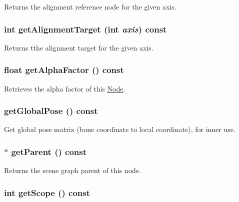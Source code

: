 Returns the alignment reference node for the given axis. \hypertarget{classm3g_1_1Node_e5bbf42b3d88193fda0b476e1b1da009}{
\subsubsection[{getAlignmentTarget}]{\setlength{\rightskip}{0pt plus 5cm}int getAlignmentTarget (int {\em axis}) const}}
\label{classm3g_1_1Node_e5bbf42b3d88193fda0b476e1b1da009}


Returns tthe alignment target for the given axis. \hypertarget{classm3g_1_1Node_bf7e8f9d9f530274aaf27e69910f8689}{
\subsubsection[{getAlphaFactor}]{\setlength{\rightskip}{0pt plus 5cm}float getAlphaFactor () const}}
\label{classm3g_1_1Node_bf7e8f9d9f530274aaf27e69910f8689}


Retrieves the alpha factor of this \hyperlink{classm3g_1_1Node}{Node}. \hypertarget{classm3g_1_1Node_b50dd3f0331a71cf820bbd1edc894ef0}{
\subsubsection[{getGlobalPose}]{ getGlobalPose () const}}
\label{classm3g_1_1Node_b50dd3f0331a71cf820bbd1edc894ef0}


Get global pose matrix (bone coordinate to local coordinate), for inner use. \hypertarget{classm3g_1_1Node_ce26c2757f265bc6038e6818d2eb6ad9}{
\subsubsection[{getParent}]{ $\ast$ getParent () const}}
\label{classm3g_1_1Node_ce26c2757f265bc6038e6818d2eb6ad9}


Returns the scene graph parent of this node. \hypertarget{classm3g_1_1Node_a3c291c19cf805338fa4ad3c3deb663a}{
\subsubsection[{getScope}]{\setlength{\rightskip}{0pt plus 5cm}int getScope () const}}
\label{classm3g_1_1Node_a3c291c19cf805338fa4ad3c3deb663a}


